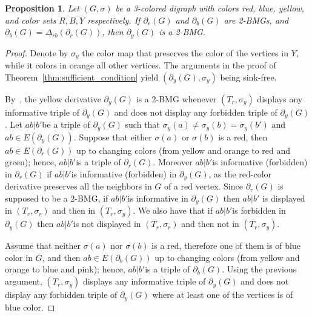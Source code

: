 \documentclass[final,3p,times]{elsarticle}
\newtheorem{proposition}[theorem]{Proposition}%
\begin{document}
\begin{proposition}\label{prop:yellow-derv}
Let $(G,\sigma)$ be a 3-colored digraph with colors red, blue, yellow, and color sets $R,B,Y$ respectively. If $\partial_r(G)$ and $\partial_b(G)$ are 2-BMGs, and $\partial_b(G)=\Delta_{rb}(\partial_r(G))$, then $\partial_{y}(G)$ is a 2-BMG.
\end{proposition}
\begin{proof}
Denote by $\sigma_y$ the color map that preserves the color of the vertices in $Y$, while it colors in orange all other vertices.
The arguments in the proof of Theorem~\ref{thm:sufficient_condition} yield $(\partial_{y}(G),\sigma_y)$ being sink-free. 

By~\cite[Proposition~2.3]{korchmaros2021quasi}, the yellow derivative $\partial_{y}(G)$ is a 2-BMG whenever $(T_r,\sigma_y)$ displays any informative triple of $\partial_{y}(G)$ and does not display any forbidden triple of $\partial_{y}(G)$. Let $ab|b'$be a triple of $\partial_{y}(G)$ such that $\sigma_y(a)\ne \sigma_y(b)=\sigma_y(b')$ and $ab\in E(\partial_{y}(G))$. Suppose that either $\sigma(a)$ or $\sigma(b)$ is a red, then $ab\in E(\partial_{r}(G))$ up to changing colors (from yellow and orange to red and green); hence, $ab|b'$is a triple of $\partial_{r}(G)$. Moreover $ab|b'$is informative (forbidden) in $\partial_{r}(G)$ if $ab|b'$is informative (forbidden) in $\partial_{y}(G)$, as the red-color derivative preserves all the neighbors in $G$ of a red vertex. Since $\partial_{r}(G)$ is supposed to be a 2-BMG, if $ab|b'$is informative in $\partial_{y}(G)$ then $ab|b'$ is displayed in $(T_r,\sigma_r)$ and then in $(T_r,\sigma_y)$. We also have that if $ab|b'$is forbidden in $\partial_{y}(G)$ then $ab|b'$is not displayed in $(T_r,\sigma_r)$ and then not in $(T_r,\sigma_y)$.

Assume that neither $\sigma(a)$ nor $\sigma(b)$ is a red, therefore one of them is of blue color in $G$, and then $ab\in E(\partial_{b}(G))$ up to changing colors (from yellow and orange to blue and pink); hence, $ab|b'$is a triple of $\partial_{b}(G)$. Using the previous argument, $(T_r,\sigma_y)$ displays any informative triple of $\partial_{y}(G)$ and does not display any forbidden triple of $\partial_{y}(G)$ where at least one of the vertices is of blue color.
\end{proof}
\end{document}
